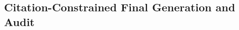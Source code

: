 

\subsection{Citation-Constrained Final Generation and Audit}
\label{subsec:framework_final_audit}

